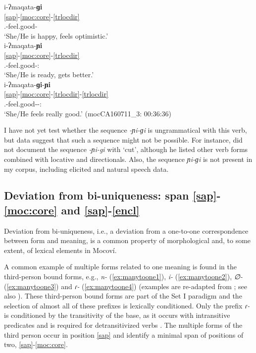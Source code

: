 \documentclass[output=paper]{langscibook}
\begin{document}
\ea \label{ex:seqlocdir}
\ea \label{ex:endlocb}
\glll i-ʔmaqata-\textbf{ɡi}  \\
    \ref{sap}-\ref{moc:core}-\ref{trlocdir}\\
      {\Third.\II}-feel.good-{\LocThree}\\
\glt `She/He is happy, feels optimistic.'  \hfill \citep[211]{Buckwalter1995}\\
\ex \label{ex:enddirb}
\glll i-ʔmaqata-\textbf{ɲi}  \\
    \ref{sap}-\ref{moc:core}-\ref{trlocdir}\\
      {\Third.\II}-feel.good-{\Dir:\Down}\\
\glt `She/He is ready, gets better.'  \hfill \citep[][211]{Buckwalter1995}\\
\ex\label{ex:enddirlocb}
\glll i-ʔmaqata-\textbf{ɡi}-\textbf{ɲi}  \\
    \ref{sap}-\ref{moc:core}-\ref{trlocdir}-\ref{trlocdir}\\
      {\Third.\II}-feel.good-{\LocThree}-{\Dir:\Down}\\
\glt `She/He feels really good.' \hfill (mocCA160711\_3: 00:36:36) \\
\z
\z

I have not yet test whether the sequence \textit{-ɲi-ɡi} is ungrammatical with this verb, but data suggest that such a sequence might not be possible. For instance,  \citet[]{Buckwalter1995} did not  document the sequence \textit{-ɲi-gi} with `cut', although he listed other verb forms combined with locative and directionals. Also, the sequence \textit{ɲi-ɡi} is not present in my corpus, including elicited and natural speech data.  

\subsection{Deviation from bi-uniqueness: span \ref{sap}-\ref{moc:core} and \ref{sap}-\ref{encl} \label{sec:deviation}}
Deviation from bi-uniqueness, i.e., a deviation from a one-to-one correspondence between form and meaning, is a common property of morphological and, to some extent, of lexical elements in Mocoví. 

A common example of multiple forms related to one meaning is found in the third-person bound forms, e.g., \textit{n-} (\ref{ex:manytoone1}), \textit{i-} (\ref{ex:manytoone2}), \textit{∅-} (\ref{ex:manytoone3}) and \textit{ɾ-} (\ref{ex:manytoone4}) (examples are re-adapted from \citealt[322]{Juarez2021}; see also \citealt{Juarez2013}). These third-person bound forms are part of the Set I paradigm and the selection of almost all of these prefixes is lexically conditioned. Only the prefix \textit{ɾ-} is conditioned by the transitivity of the base, as it occurs with intransitive predicates and is required for detransitivized verbs \citep[see][]{Juarez2017}. The multiple forms of the third person occur in position \ref{sap} and identify a minimal span of positions of two, \ref{sap}-\ref{moc:core}. 
\end{document}
